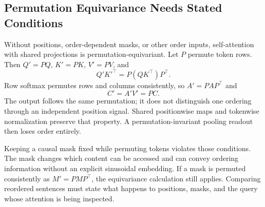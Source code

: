 \par\addvspace{\intextsep}\noindent\begin{minipage}{\linewidth}
\centering
{}
\label{fig:high-level-transformer-block}
\end{minipage}\par\addvspace{\intextsep}

\subsection{Permutation Equivariance Needs Stated Conditions}

Without positions, order-dependent masks, or other order inputs, self-attention with shared projections is permutation-equivariant. Let $P$ permute token rows. Then $Q'=PQ$, $K'=PK$, $V'=PV$, and
\[
Q'K'^\top=P(QK^\top)P^\top.
\]
Row softmax permutes rows and columns consistently, so $A'=PAP^\top$ and
\[
C'=A'V'=PC.
\]
The output follows the same permutation; it does not distinguish one ordering through an independent position signal. Shared positionwise maps and tokenwise normalization preserve that property. A permutation-invariant pooling readout then loses order entirely.

Keeping a causal mask fixed while permuting tokens violates those conditions. The mask changes which content can be accessed and can convey ordering information without an explicit sinusoidal embedding. If a mask is permuted consistently as $M'=PMP^\top$, the equivariance calculation still applies. Comparing reordered sentences must state what happens to positions, masks, and the query whose attention is being inspected.

